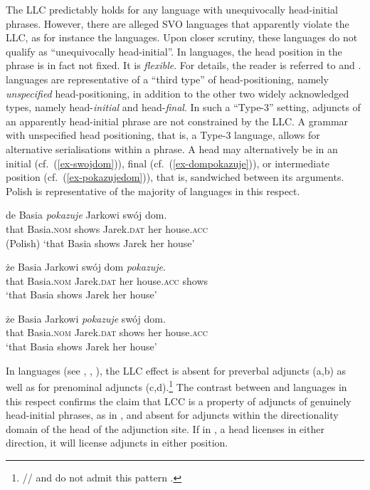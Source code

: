 \documentclass[output=paper
  ,nobabel
  ,uniformtopskip %
]{langscibook}
\begin{document}
\largerpage
\noindent
The LLC predictably holds for any language with unequivocally head-initial phrases. However, there are alleged SVO languages that apparently violate the LLC, as for instance the  languages. Upon closer scrutiny, these languages do not qualify as ``unequivocally head-initial''. In  languages, the head position in the phrase is in fact not fixed. It is \emph{flexible}. For details, the reader is referred to \citet{HaiderSzucsich2022a} and \citet{SzucsichHaider2015}.
 languages are representative of a ``third type'' of head-positioning, namely \emph{unspecified} head-positioning, in addition to the other two widely acknowledged types, namely
head-\emph{initial} and head-\emph{final}. In such a ``Type-3'' setting, adjuncts of an apparently head-initial phrase are not constrained by the LLC. A grammar with unspecified head positioning, that is, a Type-3 language, allows for alternative serialisations within a phrase. A head may alternatively be in an initial (cf.\ (\ref{ex-swojdom})), final (cf.\ (\ref{ex-dompokazuje})), or intermediate position (cf.\ (\ref{ex-pokazujedom})), that is, sandwiched between its arguments. Polish is representative of the majority of  languages in this respect.


\eal\label{ex-slavic}
\ex\label{ex-swojdom}
\gll de Basia \emph{pokazuje} Jarkowi swój dom. \\
that Basia\textsc{.nom} shows Jarek\textsc{.dat} her house\textsc{.acc} \\\hfill(Polish)
\glt `that Basia shows Jarek her house'

\ex\label{ex-dompokazuje}
\gll że Basia Jarkowi swój dom \emph{pokazuje}. \\
that Basia\textsc{.nom} Jarek\textsc{.dat} her house\textsc{.acc} shows \\
\glt `that Basia shows Jarek her house'


\ex\label{ex-pokazujedom}
\gll że Basia Jarkowi \emph{pokazuje} swój dom. \\
that Basia\textsc{.nom} Jarek\textsc{.dat} shows her house\textsc{.acc} \\
\glt `that Basia shows Jarek her house'

\zl

\largerpage
\noindent
In  languages (see \citealt[116]{SiewierskaUhlirova1998a}, \citealt[16]{HaiderSzucsich2022a},
\citealt[Section~6]{HaiderSzucsich2022b}), the LLC effect is absent for preverbal adjuncts
(a,b) as well as for prenominal adjuncts (c,d).\footnote{%
// and  do not admit this pattern \citep[116]{SiewierskaUhlirova1998a}.
} The contrast between  and 
languages in this respect confirms the claim that LCC is a property of adjuncts of genuinely
head-initial phrases, as in , and absent for adjuncts within the directionality domain of the
head of the adjunction site. If in , a head licenses in either direction, it will license
adjuncts in either position.
\end{document}
